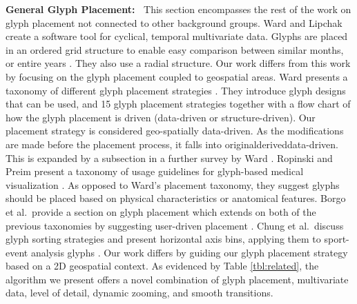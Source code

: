\textbf{General Glyph Placement:~} 
This section encompasses the rest of the work on glyph placement not connected to other background groups. Ward and Lipchak create a software tool for cyclical, temporal multivariate data. Glyphs are placed in an ordered grid structure to enable easy comparison between similar months, or entire years \cite{ward2000visualization}. They also use a radial structure. Our work differs from this work by focusing on the glyph placement coupled to geospatial areas. 
Ward presents a taxonomy of different glyph placement strategies \cite{ward2002taxonomy}. They introduce glyph designs that can be used, and 15 glyph placement strategies together with a flow chart of how the glyph placement is driven (data-driven or structure-driven). Our placement strategy is considered geo-spatially data-driven. As the modifications are made before the placement process, it falls into original\arrow{}derived\arrow{}data-driven. This is expanded by a subsection in a further survey by Ward \cite{ward2008multivariate}.
Ropinski and Preim present a taxonomy of usage guidelines for glyph-based medical visualization \cite{ropinski2008taxonomy}. As opposed to Ward's placement taxonomy, they suggest glyphs should be placed based on physical characteristics or anatomical features.
Borgo et al.\ provide a section on glyph placement which extends on both of the previous taxonomies by suggesting user-driven placement \cite{borgo2013glyph}.
Chung et al.\ discuss glyph sorting strategies and present horizontal axis bins, applying them to sport-event analysis glyphs \cite{chung2015glyph}. Our work differs by guiding our glyph placement strategy based on a 2D geospatial context. As evidenced by Table \ref{tbl:related}, the algorithm we present offers a novel combination of glyph placement, multivariate data, level of detail, dynamic zooming, and smooth transitions.

